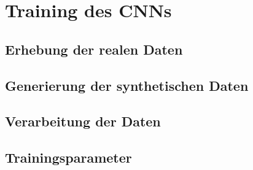
\section{Training des CNNs}
\subsection{Erhebung der realen Daten}
\subsection{Generierung der synthetischen Daten}
\subsection{Verarbeitung der Daten}
\subsection{Trainingsparameter}